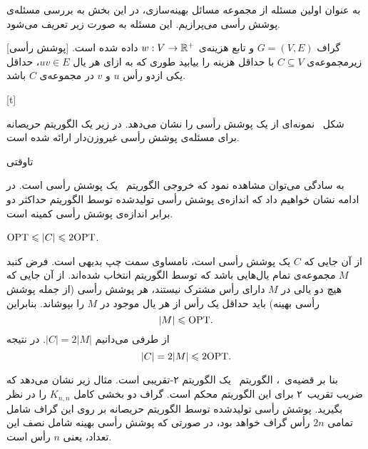 


به عنوان اولین مسئله از مجموعه مسائل بهینه‌سازی،
در این بخش به بررسی مسئله‌ی پوشش رأسی می‌پرازیم.
این مسئله به صورت زیر تعریف می‌شود.

[پوشش رأسی]
گراف $G=(V,E)$  و تابع هزینه‌ی $w:V \rightarrow \mathbb{R}^{+}$ داده شده است.
زیرمجموعه‌ی $C \subseteq V$ با حداقل هزینه را بیابید طوری که 
به ازای هر یال $uv \in E$، حداقل یکی ازدو رأس $u$ و $v$  در مجموعه‌ی $C$ باشد.


[t]


شکل~ 
نمونه‌ای از یک پوشش رأسی را نشان می‌دهد.
در زیر یک الگوریتم حریصانه برای مسئله‌ی پوشش رأسی غیروزن‌دار ارائه شده است.


‌تاوقتی


به سادگی می‌توان مشاهده نمود که خروجی الگوریتم~
یک پوشش رأسی است.
در ادامه نشان خواهیم داد که اندازه‌ی پوشش رأسی تولیدشده توسط الگوریتم
حداکثر دو برابر اندازه‌ی پوشش رأسی کمینه است.

 
$\mathrm{OPT} \leqslant |C| \leqslant 2 \mathrm{OPT}$.

از آن جایی که $C$ یک پوشش رأسی است، نامساوی سمت چپ بدیهی است.
فرض کنبد $M$ مجموعه‌ی تمام یال‌هایی باشد که توسط الگوریتم انتخاب شده‌اند. 
از آن‌ جایی که هیچ دو یالی در $M$ دارای رأس مشترک نیستند، 
هر پوشش رأسی (از جمله پوشش رأسی بهینه) 
باید حداقل یک رأس از هر یال موجود در $M$ را بپوشاند. بنابراین
$$|M| \leqslant \mathrm{OPT}.$$
از طرفی می‌دانیم $|C| = 2|M|$. در نتیجه
$$
	|C| = 2|M| \leqslant 2 \mathrm{OPT}.
$$

بنا بر قضیه‌ی~، 
الگوریتم~ یک الگوریتم ۲-تقریبی است.
مثال زیر نشان می‌دهد که ضریب تقریب~۲ برای این الگوریتم محکم است.
گراف دو بخشی کامل $K_{n,n}$ را در نظر بگیرید.
پوشش رأسی تولیدشده توسط الگوریتم حریصانه بر روی این گراف
شامل تمامی $2n$ رأس گراف خواهد بود، در صورتی که پوشش رأسی بهینه
شامل نصف این تعداد، یعنی $n$ رأس است.


 


